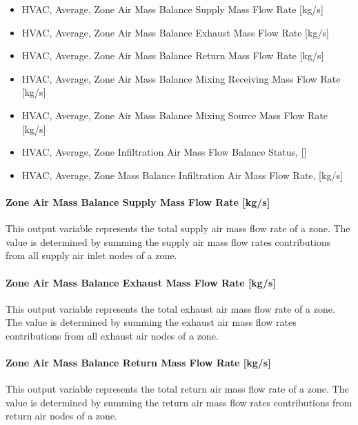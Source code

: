 \begin{itemize}
\item
  HVAC, Average, Zone Air Mass Balance Supply Mass Flow Rate {[}kg/s{]}
\item
  HVAC, Average, Zone Air Mass Balance Exhaust Mass Flow Rate {[}kg/s{]}
\item
  HVAC, Average, Zone Air Mass Balance Return Mass Flow Rate {[}kg/s{]}
\item
  HVAC, Average, Zone Air Mass Balance Mixing Receiving Mass Flow Rate {[}kg/s{]}
\item
  HVAC, Average, Zone Air Mass Balance Mixing Source Mass Flow Rate {[}kg/s{]}
\item
  HVAC, Average, Zone Infiltration Air Mass Flow Balance Status, {[]}
\item
  HVAC, Average, Zone Mass Balance Infiltration Air Mass Flow Rate, {[}kg/s{]}
\end{itemize}

\paragraph{Zone Air Mass Balance Supply Mass Flow Rate {[}kg/s{]}}\label{zone-air-mass-balance-supply-mass-flow-rate-kgs}

This output variable represents the total supply air mass flow rate of a zone. The value is determined by summing the supply air mass flow rates contributions from all supply air inlet nodes of a zone.

\paragraph{Zone Air Mass Balance Exhaust Mass Flow Rate {[}kg/s{]}}\label{zone-air-mass-balance-exhaust-mass-flow-rate-kgs}

This output variable represents the total exhaust air mass flow rate of a zone. The value is determined by summing the exhaust air mass flow rates contributions from all exhaust air nodes of a zone.

\paragraph{Zone Air Mass Balance Return Mass Flow Rate {[}kg/s{]}}\label{zone-air-mass-balance-return-mass-flow-rate-kgs}

This output variable represents the total return air mass flow rate of a zone. The value is determined by summing the return air mass flow rates contributions from return air nodes of a zone.

